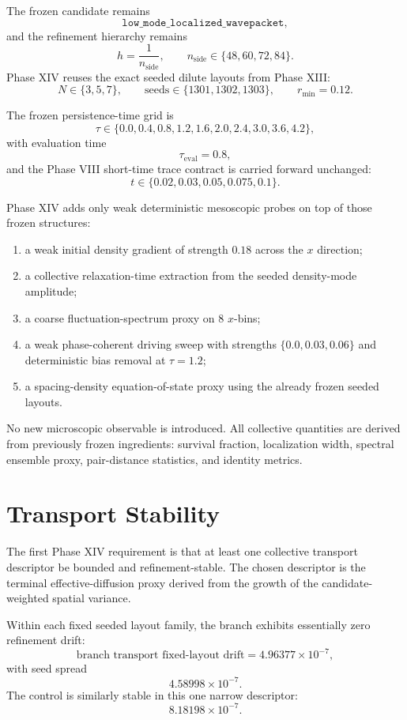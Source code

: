 \documentclass[11pt]{article}
\begin{document}
The frozen candidate remains
\[
\texttt{low\_mode\_localized\_wavepacket},
\]
and the refinement hierarchy remains
\[
h = \frac{1}{n_{\mathrm{side}}},
\qquad
n_{\mathrm{side}} \in \{48,60,72,84\}.
\]
Phase XIV reuses the exact seeded dilute layouts from Phase XIII:
\[
N \in \{3,5,7\},
\qquad
\text{seeds} \in \{1301,1302,1303\},
\qquad
r_{\min}=0.12.
\]

The frozen persistence-time grid is
\[
\tau \in \{0.0,0.4,0.8,1.2,1.6,2.0,2.4,3.0,3.6,4.2\},
\]
with evaluation time
\[
\tau_{\mathrm{eval}}=0.8,
\]
and the Phase VIII short-time trace contract is carried forward unchanged:
\[
t \in \{0.02,0.03,0.05,0.075,0.1\}.
\]

Phase XIV adds only weak deterministic mesoscopic probes on top of those frozen structures:
\begin{enumerate}
\item a weak initial density gradient of strength $0.18$ across the $x$ direction;
\item a collective relaxation-time extraction from the seeded density-mode amplitude;
\item a coarse fluctuation-spectrum proxy on $8$ $x$-bins;
\item a weak phase-coherent driving sweep with strengths $\{0.0,0.03,0.06\}$ and deterministic bias removal at $\tau=1.2$;
\item a spacing-density equation-of-state proxy using the already frozen seeded layouts.
\end{enumerate}

No new microscopic observable is introduced. All collective quantities are derived from previously frozen ingredients: survival fraction, localization width, spectral ensemble proxy, pair-distance statistics, and identity metrics.

\section{Transport Stability}

The first Phase XIV requirement is that at least one collective transport descriptor be bounded and refinement-stable. The chosen descriptor is the terminal effective-diffusion proxy derived from the growth of the candidate-weighted spatial variance.

Within each fixed seeded layout family, the branch exhibits essentially zero refinement drift:
\[
\text{branch transport fixed-layout drift}
= 4.96377\times 10^{-7},
\]
with seed spread
\[
4.58998\times 10^{-7}.
\]
The control is similarly stable in this one narrow descriptor:
\[
8.18198\times 10^{-7}.
\]
\end{document}
